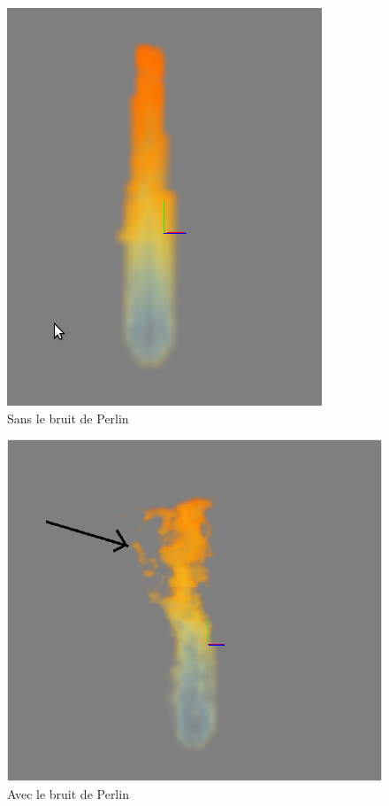 \documentclass{beamer}
\begin{document}
\begin{frame}{}
  \begin{minipage}{0.48\linewidth} 
    \begin{figure}[!h]
      \centering\includegraphics[scale=0.3]{SansPerlin.png}
      \caption{Sans le bruit de Perlin}
      \label{SansPerlin}
    \end{figure}
  \end{minipage}
  \begin{minipage}{0.48\linewidth}
    \begin{figure}[!h]
      \centering\includegraphics[scale=0.2]{Perlin1.png}
      \caption{Avec le bruit de Perlin}
      \label{AvecPerlin}
    \end{figure}
  \end{minipage}
\end{frame}
\end{document}

